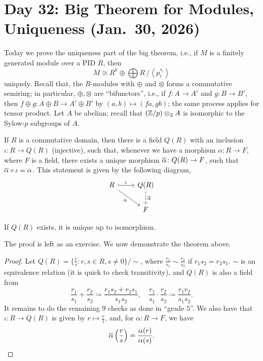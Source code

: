 \section{Day 32: Big Theorem for Modules, Uniqueness (Jan.\ 30, 2026)}
Today we prove the uniqueness part of the big theorem, i.e., if $M$ is a finitely generated module over a PID $R$, then
\[ M \cong R^k \oplus \bigoplus R\,/\!\left<p_i^{s_i}\right> \]
uniquely. Recall that, the $R$-modules with $\oplus$ and $\otimes$ forms a commutative semiring; in particular, $\oplus, \otimes$ are ``bifunctors'', i.e., if $f \colon A \to A'$ and $g \colon B \to B'$, then $f \oplus g \colon A \oplus B \to A' \oplus B'$ by $(a, b) \mapsto (fa, gb)$; the same process applies for tensor product. Let $A$ be abelian; recall that $(\mathbb Z/p) \otimes_\mathbb Z A$ is isomorphic to the Sylow-$p$ subgroups of $A$.
\begin{theorem}
    If $R$ is a commutative domain, then there is a field $Q(R)$ with an inclusion $\iota \colon R \to Q(R)$ (injective), such that, whenever we have a morphism $\alpha \colon R \to F$, where $F$ is a field, there exists a unique morphism $\overline \alpha \colon Q(R) \to F$, such that $\overline \alpha \circ \iota = \alpha$. This statement is given by the following diagram,
    \[ \begin{tikzcd} R \arrow[r, hookrightarrow, "\iota"] \arrow[rd, "\alpha"'] & Q(R) \arrow[d, dashed, "\ol \alpha"] \\ & F \end{tikzcd} \]
\end{theorem}
\begin{fact}
    If $Q(R)$ exists, it is unique up to isomorphism.
\end{fact}
The proof is left as an exercise. We now demonstrate the theorem above.
\begin{proof}
    Let $Q(R) = \{\frac{r}{s} : r, s \in R, s \neq 0\} / \sim$, where $\frac{r_1}{s_1} \sim \frac{r_2}{s_2}$ if $r_1s_2 = r_2s_1$. $\sim$ is an equivalence relation (it is quick to check transitivity), and $Q(R)$ is also a field from
    \[ \frac{r_1}{s_1} + \frac{r_2}{s_2} \coloneq \frac{r_1s_2 + r_2s_1}{s_1s_2}, \quad \frac{r_1}{s_1} \cdot \frac{r_2}{s_2} \coloneq \frac{r_1r_2}{s_1s_2}. \]
    It remains to do the remaining $9$ checks as done in ``grade $5$''. We also have that $\iota \colon R \to Q(R)$ is given by $r \mapsto \frac{r}{1}$, and, for $\alpha \colon R \to F$, we have
    \[ \overline \alpha \left(\frac{r}{s}\right) = \frac{\alpha(r)}{\alpha(s)}. \qedhere \]
\end{proof}
